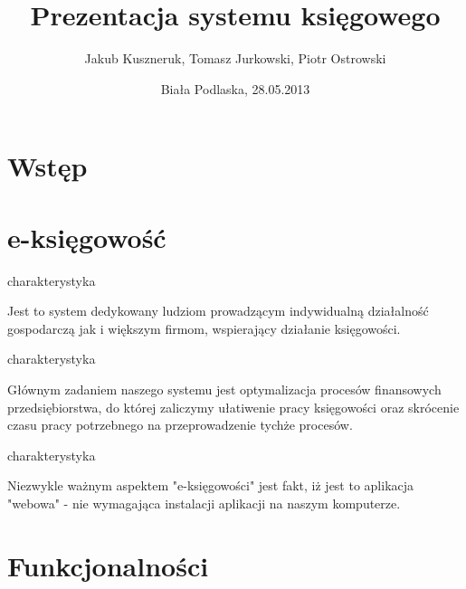 \documentclass{beamer}
\title
  [Księgowość]
  {Prezentacja systemu księgowego}
\author[grupa 3, podgrupa 2]{Jakub Kuszneruk, Tomasz Jurkowski, Piotr Ostrowski}
\institute[Uniwersytet Warszawski]{
Wydział Matematyki Informatyki i Mechaniki}
\date[2013]{Biała Podlaska, 28.05.2013}
\begin{document}
  \begin{frame}{}
    \titlepage
  \end{frame}
\section{Wstęp}
  \begin{frame}
    \tableofcontents
  \end{frame}
\section{e-księgowość}

  \begin{frame}{charakterystyka}
    \begin{block}{}
      Jest to system dedykowany ludziom prowadzącym indywidualną działalność gospodarczą jak i większym firmom, wspierający działanie księgowości.
    \end{block}
  \end{frame}
  \begin{frame}{charakterystyka}
    \begin{block}{}
      Głównym zadaniem naszego systemu jest optymalizacja procesów finansowych przedsiębiorstwa, do której zaliczymy ułatiwenie pracy księgowości oraz skrócenie czasu pracy potrzebnego na przeprowadzenie tychże procesów.
    \end{block}
  \end{frame}
  \begin{frame}{charakterystyka}
    \begin{block}{}
      Niezwykle ważnym aspektem "e-księgowości" jest fakt, iż jest to aplikacja "webowa" - nie wymagająca instalacji aplikacji na naszym komputerze.
    \end{block}
  \end{frame}
\section{Funkcjonalności}
\end{document}
